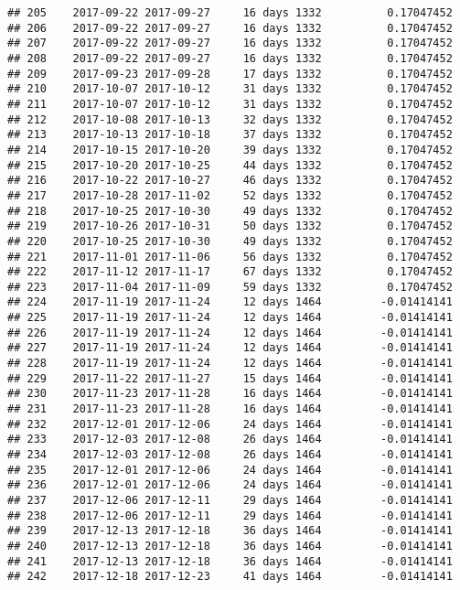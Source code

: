 \documentclass[]{article}
\begin{document}
\begin{verbatim}
## 205    2017-09-22 2017-09-27     16 days 1332          0.17047452
## 206    2017-09-22 2017-09-27     16 days 1332          0.17047452
## 207    2017-09-22 2017-09-27     16 days 1332          0.17047452
## 208    2017-09-22 2017-09-27     16 days 1332          0.17047452
## 209    2017-09-23 2017-09-28     17 days 1332          0.17047452
## 210    2017-10-07 2017-10-12     31 days 1332          0.17047452
## 211    2017-10-07 2017-10-12     31 days 1332          0.17047452
## 212    2017-10-08 2017-10-13     32 days 1332          0.17047452
## 213    2017-10-13 2017-10-18     37 days 1332          0.17047452
## 214    2017-10-15 2017-10-20     39 days 1332          0.17047452
## 215    2017-10-20 2017-10-25     44 days 1332          0.17047452
## 216    2017-10-22 2017-10-27     46 days 1332          0.17047452
## 217    2017-10-28 2017-11-02     52 days 1332          0.17047452
## 218    2017-10-25 2017-10-30     49 days 1332          0.17047452
## 219    2017-10-26 2017-10-31     50 days 1332          0.17047452
## 220    2017-10-25 2017-10-30     49 days 1332          0.17047452
## 221    2017-11-01 2017-11-06     56 days 1332          0.17047452
## 222    2017-11-12 2017-11-17     67 days 1332          0.17047452
## 223    2017-11-04 2017-11-09     59 days 1332          0.17047452
## 224    2017-11-19 2017-11-24     12 days 1464         -0.01414141
## 225    2017-11-19 2017-11-24     12 days 1464         -0.01414141
## 226    2017-11-19 2017-11-24     12 days 1464         -0.01414141
## 227    2017-11-19 2017-11-24     12 days 1464         -0.01414141
## 228    2017-11-19 2017-11-24     12 days 1464         -0.01414141
## 229    2017-11-22 2017-11-27     15 days 1464         -0.01414141
## 230    2017-11-23 2017-11-28     16 days 1464         -0.01414141
## 231    2017-11-23 2017-11-28     16 days 1464         -0.01414141
## 232    2017-12-01 2017-12-06     24 days 1464         -0.01414141
## 233    2017-12-03 2017-12-08     26 days 1464         -0.01414141
## 234    2017-12-03 2017-12-08     26 days 1464         -0.01414141
## 235    2017-12-01 2017-12-06     24 days 1464         -0.01414141
## 236    2017-12-01 2017-12-06     24 days 1464         -0.01414141
## 237    2017-12-06 2017-12-11     29 days 1464         -0.01414141
## 238    2017-12-06 2017-12-11     29 days 1464         -0.01414141
## 239    2017-12-13 2017-12-18     36 days 1464         -0.01414141
## 240    2017-12-13 2017-12-18     36 days 1464         -0.01414141
## 241    2017-12-13 2017-12-18     36 days 1464         -0.01414141
## 242    2017-12-18 2017-12-23     41 days 1464         -0.01414141

\end{verbatim}
\end{document}
